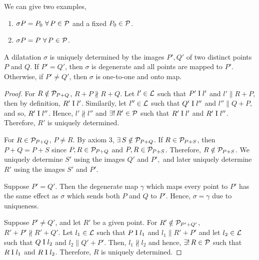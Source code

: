 \noindent
We can give two examples,
\begin{enumerate}[label=\roman*.]
    \item $\sigma P=P_0\ \forall\, P \in \mathcal{P}$ and a fixed $P_0 \in \mathcal{P}$.
    \item $\sigma P=P\ \forall\, P \in \mathcal{P}$.
\end{enumerate}

\begin{theorem}
    A dilatation $\sigma$ is uniquely determined by the images $P', Q'$ of two distinct points $P$ and $Q$. If $P'=Q'$, then $\sigma$ is degenerate and all points are mapped to $P'$. Otherwise, if $P' \neq Q'$, then $\sigma$ is one-to-one and onto map.
\end{theorem}
\begin{proof}
    For $R \notin \mathcal{P}_{P+Q}$, $R+P \nparallel R+Q$. Let $l' \in \mathcal{L}$ such that $P' \mathrel\text{I} l'$ and $l' \parallel R+P$, then by definition, $R' \mathrel\text{I} l'$. Similarily, let $l'' \in \mathcal{L}$ such that $Q' \mathrel\text{I} l''$ and $l'' \parallel Q+P$, and so, $R' \mathrel\text{I} l''$. Hence, $l' \nparallel l''$ and $\exists!\, R' \in \mathcal{P}$ such that $R' \mathrel\text{I} l'$ and $R' \mathrel\text{I} l''$. Therefore, $R'$ is uniquely determined.

    \vspace{1ex}

    \noindent
    For $R \in \mathcal{P}_{P+Q}$, $P \neq R$. By axiom 3, $\exists\, S \notin \mathcal{P}_{P+Q}$. If $R \in \mathcal{P}_{P+S}$, then $P+Q=P+S$ since $P,R \in \mathcal{P}_{P+Q}$ and $P,R \in \mathcal{P}_{P+S}$. Therefore, $R \notin \mathcal{P}_{P+S}$. We uniquely determine $S'$ using the images $Q'$ and $P',$ and later uniquely determine $R'$ using the images $S'$ and $P'.$

    \vspace{1ex}

    Suppose $P' = Q'$. Then the degenerate map $\gamma$ which maps every point to $P'$ has the same effect as $\sigma$ which sends both $P$ and $Q$ to $P'$. Hence, $\sigma = \gamma$ due to uniqueness.

    \vspace{1ex}

    \noindent
    Suppose $P' \neq Q'$, and let $R'$ be a given point. For $R' \notin \mathcal{P}_{P'+Q'}$, $R'+P' \nparallel R'+Q'$. Let $l_1 \in \mathcal{L}$ such that $P \mathrel\text{I} l_1$ and $l_1 \parallel R'+P'$ and let $l_2 \in \mathcal{L}$ such that $Q \mathrel\text{I} l_2$ and $l_2 \parallel Q'+P'$. Then, $l_1 \nparallel l_2$ and hence, $\exists!\,R \in \mathcal{P}$ such that $R \mathrel\text{I} l_1$ and $R \mathrel\text{I} l_2$. Therefore, $R$ is uniquely determined.


\end{proof}
